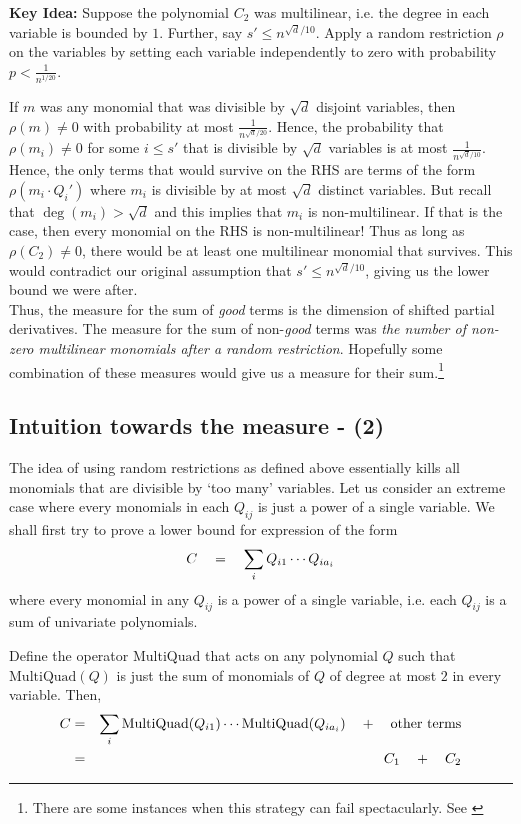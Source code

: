 {\bf Key Idea:} Suppose the polynomial $C_2$ was multilinear, i.e. the degree in each variable is bounded by $1$.  Further, say $s' \leq n^{\sqrt{d}/10}$. Apply a random restriction $\rho$ on the variables by setting each variable independently to zero with probability $p < \frac{1}{n^{1/20}}$. 

If $m$ was any monomial that was divisible by $\sqrt{d}$ disjoint variables, then $\rho(m) \neq 0$ with probability at most $\frac{1}{n^{\sqrt{d}/20}}$. Hence, the probability that $\rho(m_i) \neq 0$ for some $i\leq s'$ that is divisible  by $\sqrt{d}$ variables is at most $\frac{1}{n^{\sqrt{d}/10}}$. Hence, the only terms that would survive on the RHS are terms of the form $\rho(m_i \cdot Q_i')$ where $m_i$ is divisible by at most $\sqrt{d}$ distinct variables. But recall that $\deg(m_i) > \sqrt{d}$ and this implies that $m_i$ is non-multilinear. If that is the case, then every monomial on the RHS is non-multilinear! Thus as long as $\rho(C_2) \neq 0$, there would be at least one multilinear monomial that survives. This would contradict our original assumption that $s' \leq n^{\sqrt{d}/10}$, giving us the lower bound we were after. \\

Thus, the measure for the sum of \emph{good} terms is the dimension of shifted partial derivatives. The measure for the sum of non-\emph{good} terms was \emph{the number of non-zero multilinear monomials after a random restriction}. Hopefully some combination of these measures would give us a measure for their sum.\footnote{There are some instances when this strategy can fail spectacularly. See \cite{KS14a}}

\subsection*{Intuition towards the measure - (2)}

The idea of using random restrictions as defined above essentially kills all monomials that are divisible by `too many' variables. Let us consider an extreme case where every monomials in each $Q_{ij}$ is just a power of a single variable. We shall first try to prove a lower bound for expression of the form
\[
C\quad = \quad \sum_{i}Q_{i1}\cdots Q_{ia_i}
\]
where every monomial in any $Q_{ij}$ is a power of a single variable, i.e. each $Q_{ij}$ is a sum of univariate polynomials. 

Define the operator $\mathrm{MultiQuad}$ that acts on any polynomial $Q$ such that $\mathrm{MultiQuad}(Q)$ is just the sum of monomials of $Q$ of degree at most $2$ in every variable. Then,
\begin{eqnarray*}
C &=&  \sum_{i}\mathrm{MultiQuad}(Q_{i1})\cdots \mathrm{MultiQuad}(Q_{ia_i}) \quad + \quad \text{other terms}\\
  & = & \qquad C_1 \quad + \quad C_2
\end{eqnarray*}

